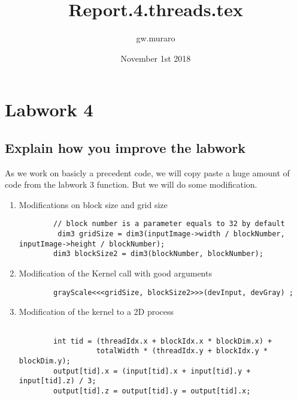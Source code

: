 \documentclass{article}
\title{Report.4.threads.tex}
\author{gw.muraro}
\date{November 1st 2018}
\begin{document}
\maketitle
\section{Labwork 4}
\subsection{Explain how you improve the labwork}

    As we work on basicly a precedent code, we will copy paste a huge amount of code from the labwork 3 function. But we will do some modification. 
    
    
    \begin{enumerate}

    \item Modifications on block size and grid size
    \begin{verbatim}
        // block number is a parameter equals to 32 by default
         dim3 gridSize = dim3(inputImage->width / blockNumber, inputImage->height / blockNumber);
        dim3 blockSize2 = dim3(blockNumber, blockNumber);
    \end{verbatim}

    \item Modification of the Kernel call with good arguments 
    \begin{verbatim}
        grayScale<<<gridSize, blockSize2>>>(devInput, devGray) ;    
    \end{verbatim}

    \item Modification of the kernel to a 2D process
    \begin{verbatim}
        
        int tid = (threadIdx.x + blockIdx.x * blockDim.x) + 
                  totalWidth * (threadIdx.y + blockIdx.y * blockDim.y);
        output[tid].x = (input[tid].x + input[tid].y + input[tid].z) / 3;
        output[tid].z = output[tid].y = output[tid].x;

    \end{verbatim}

    \end{enumerate}    
\end{document}
